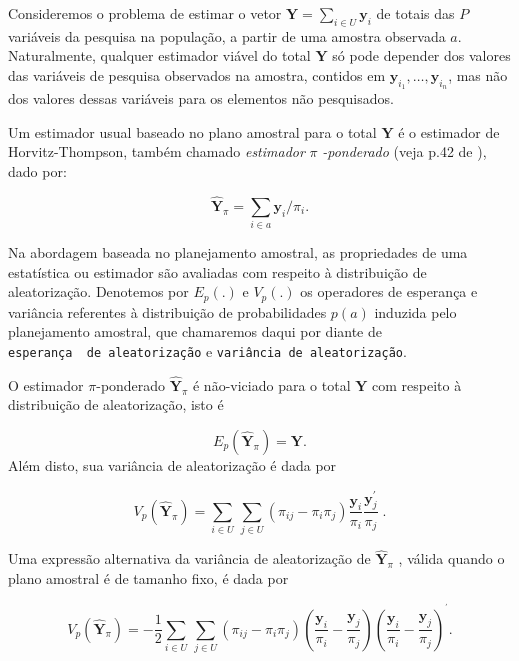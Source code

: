 \documentclass[]{book}
\theoremstyle{definition}
\theoremstyle{definition}
\theoremstyle{definition}
\theoremstyle{remark}
\begin{document}
Consideremos o problema de estimar o vetor
\(\mathbf{Y}=\sum_{i \in U}\mathbf{y}_i\) de totais das \(P\) variáveis
da pesquisa na população, a partir de uma amostra observada \(a\).
Naturalmente, qualquer estimador viável do total \(\mathbf{Y}\) só pode
depender dos valores das variáveis de pesquisa observados na amostra,
contidos em \(\mathbf{y}_{i_{1}}, \ldots , \mathbf{y}_{i_{n}}\), mas não
dos valores dessas variáveis para os elementos não pesquisados.

Um estimador usual baseado no plano amostral para o total \(\mathbf{Y}\)
é o estimador de Horvitz-Thompson, também chamado \emph{estimador}
\(\pi\) \emph{-ponderado} (veja p.42 de \citep{SSW92}), dado por:

\begin{equation}
\hat{\mathbf{Y}}_\pi = \sum_{i \in a} \mathbf{y}_i / \pi_{i} . \label{eq:estpa1}
\end{equation}

Na abordagem baseada no planejamento amostral, as propriedades de uma
estatística ou estimador são avaliadas com respeito à distribuição de
aleatorização. Denotemos por \(E_p(.)\) e \(V_p(.)\) os operadores de
esperança e variância referentes à distribuição de probabilidades
\(p(a)\) induzida pelo planejamento amostral, que chamaremos daqui por
diante de \texttt{esperança\ \ de\ aleatorização} e
\texttt{variância\ de\ aleatorização}.

O estimador \(\pi\)-ponderado \(\mathbf{\hat{Y}}_{\pi}\) é não-viciado
para o total \(\mathbf{Y}\) com respeito à distribuição de
aleatorização, isto é

\[
E_p \left( \mathbf{\hat{Y}}_{\pi} \right) = \mathbf{Y} . 
\] Além disto, sua variância de aleatorização é dada por

\begin{equation}
V_p \left( \mathbf{\hat{Y}}_{\pi} \right) = \sum_{ i \in U} \, \sum_{j \in U} \left( \pi _{ij} - \pi_i \pi_j \right) \frac{ \mathbf{y}_i} {\pi_i} \frac{\mathbf{y}_j ^{\prime} } {\pi_j} \; .  \label{eq:estpa2}
\end{equation}

Uma expressão alternativa da variância de aleatorização de
\(\mathbf{\hat{Y}}_{\pi}\) , válida quando o plano amostral é de tamanho
fixo, é dada por

\begin{equation}
V_p \left( \mathbf{\hat{Y}}_{\pi} \right) = -\frac{1}{2} \sum_{i \in U} \, \sum_{j \in U} \left( \pi_{ij} - \pi_i \pi_j \right) \left( \frac{\mathbf{y}_i} {\pi_i} - \frac{\mathbf{y}_j} {\pi_j} \right) \left( \frac{\mathbf{y}_i} {\pi_i} - \frac{\mathbf{y}_j} {\pi_j} \right) ^{^{\prime}}.  \label{eq:estpa3}
\end{equation}
\end{document}
